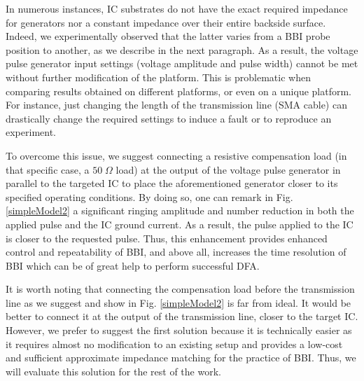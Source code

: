 \documentclass[10pt, conference, compsocconf]{IEEEtran}
\begin{document}
In numerous instances, IC substrates do not have the exact required impedance for generators nor a constant impedance over their entire backside surface.
Indeed, we experimentally observed that the latter varies from a BBI probe position to another, as we describe in the next paragraph.
As a result, the voltage pulse generator input settings (voltage amplitude and pulse width) cannot be met without further modification of the platform.
This is problematic when comparing results obtained on different platforms, or even on a unique platform.
For instance, just changing the length of the transmission line (SMA cable) can drastically change the required settings to induce a fault or to reproduce an experiment.

To overcome this issue, we suggest connecting a resistive compensation load (in that specific case, a $50 \; \Omega$ load) at the output of the voltage pulse generator in parallel to the targeted IC to place the aforementioned generator closer to its specified operating conditions.
By doing so, one can remark in Fig. \ref{simpleModel2} a significant ringing amplitude and number reduction in both the applied pulse and the IC ground current.
As a result, the pulse applied to the IC is closer to the requested pulse.
Thus, this enhancement provides enhanced control and repeatability of BBI, and above all, increases the time resolution of BBI which can be of great help to perform successful DFA.

It is worth noting that connecting the compensation load before the transmission line as we suggest and show in Fig. \ref{simpleModel2} is far from ideal.
It would be better to connect it at the output of the transmission line, closer to the target IC.
However, we prefer to suggest the first solution because it is technically easier as it requires almost no modification to an existing setup and provides a low-cost and sufficient approximate impedance matching for the practice of BBI.
Thus, we will evaluate this solution for the rest of the work.
\end{document}
